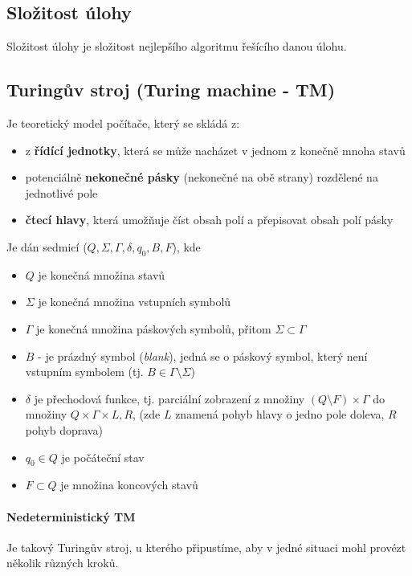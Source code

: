 \subsection*{Složitost úlohy}
Složitost úlohy je složitost nejlepšího algoritmu řešícího danou úlohu.

\label{heading:tm}
\subsection*{Turingův stroj (Turing machine - TM)}
Je teoretický model počítače, který se skládá z:

\begin{itemize}[itemsep=0pt]
    \item z \textbf{řídící jednotky}, která se může nacházet v jednom z konečně mnoha stavů
    \item potenciálně \textbf{nekonečné pásky} (nekonečné na obě strany) rozdělené na jednotlivé pole
    \item \textbf{čtecí hlavy}, která umožňuje číst obsah polí a přepisovat obsah polí pásky
\end{itemize}

\noindent Je dán sedmicí ($Q,\Sigma, \Gamma, \delta, 
q_0, B, F$), kde

\begin{itemize}[itemsep=0pt]
    \item $Q$ je konečná množina stavů
    \item $\Sigma$ je konečná množina vstupních symbolů
    \item $\Gamma$ je konečná množina páskových symbolů, přitom $\Sigma \subset \Gamma$
    \item $B$ - je prázdný symbol (\textit{blank}), jedná se o páskový symbol, který není vstupním symbolem (tj. $B \in \Gamma \setminus \Sigma$)
    \item $\delta$ je přechodová funkce, tj. parciální zobrazení z množiny $(Q \setminus F) \times \Gamma$ do množiny $Q \times \Gamma \times {L,R}$, (zde $L$ znamená pohyb hlavy o jedno pole doleva, $R$ pohyb doprava)
    \item $q_0 \in Q$ je počáteční stav
    \item $F \subset Q$ je množina koncových stavů
\end{itemize}

\paragraph{Nedeterministický TM} Je takový Turingův stroj, u kterého připustíme, aby v jedné situaci mohl provézt několik různých kroků.

